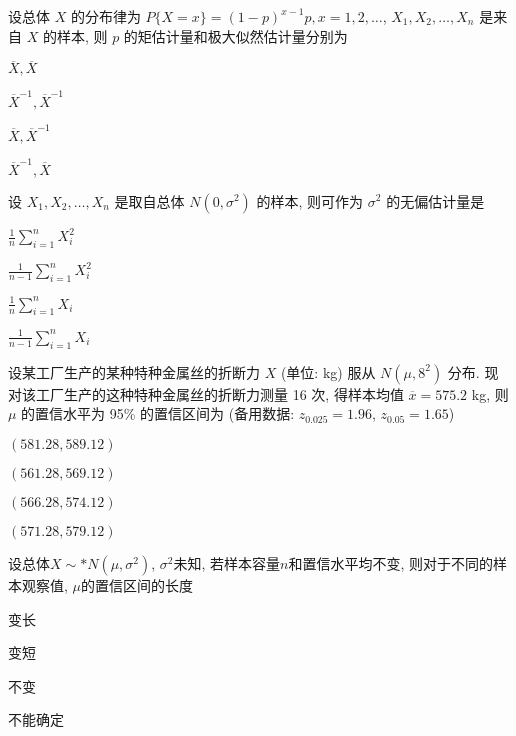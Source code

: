 \documentclass{exam-zh}
\begin{document}
\begin{question}
  设总体 $X$ 的分布律为 $P\{X = x\} = (1-p)^{x-1}p, x = 1, 2, \dots$, $X_1, X_2, \dots, X_n$ 是来自 $X$ 的样本, 则 $p$ 的矩估计量和极大似然估计量分别为 \paren[B]
 
  \begin{choices}
    \item $\overline{X}, \overline{X}$
    \item $\overline{X}^{-1}, \overline{X}^{-1}$
    \item $\overline{X}, \overline{X}^{-1}$
    \item $\overline{X}^{-1}, \overline{X}$
  \end{choices}
\end{question}

\begin{question}
  设 $X_1, X_2, \dots, X_n$ 是取自总体 $N(0, \sigma^2)$ 的样本, 则可作为 $\sigma^2$ 的无偏估计量是\paren[A]
  
  \begin{choices}
    \item $\frac{1}{n}\sum_{i=1}^{n}X_i^2$
    \item $\frac{1}{n-1}\sum_{i=1}^{n}X_i^2$
    \item $\frac{1}{n}\sum_{i=1}^{n}X_i$
    \item $\frac{1}{n-1}\sum_{i=1}^{n}X_i$
  \end{choices}
\end{question}

\begin{question}
  设某工厂生产的某种特种金属丝的折断力 $X$ (单位: kg) 服从 $N(\mu, 8^2)$ 分布. 现对该工厂生产的这种特种金属丝的折断力测量 16 次, 得样本均值 $\overline{x} = 575.2$ kg, 则 $\mu$ 的置信水平为 95\% 的置信区间为
  (备用数据: $z_{0.025} = 1.96$, $z_{0.05} = 1.65$)
  \paren[D]

  \begin{choices}
    \item $(581.28, 589.12)$
    \item $(561.28, 569.12)$
    \item $(566.28, 574.12)$
    \item $(571.28, 579.12)$
  \end{choices}
\end{question}

\begin{question}
  设总体$X \sim* N(\mu, \sigma^2)$, $\sigma^2$未知, 若样本容量$n$和置信水平均不变, 则对于不同的样本观察值, $\mu$的置信区间的长度\paren[D]
  
  \begin{choices}
      \item 变长
      \item 变短
      \item 不变
      \item 不能确定
  \end{choices}
\end{question}
\end{document}
